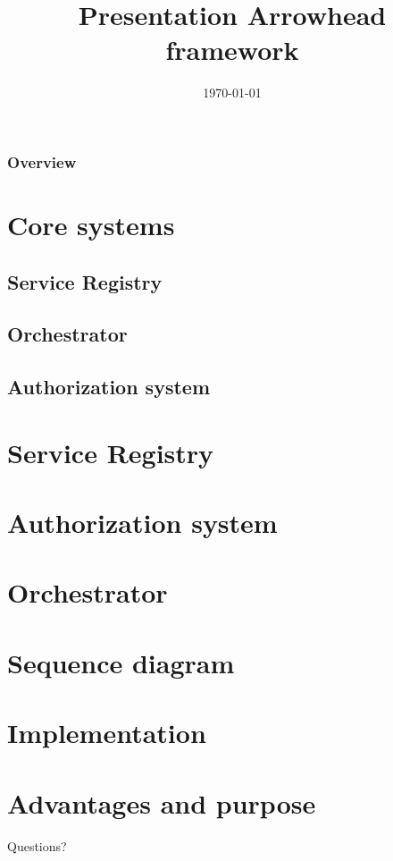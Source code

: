 \documentclass[15pt]{beamer}
\title{Presentation Arrowhead framework}
\author{}
\institute{Luleå University of Technology}
\date{\today}
\begin{document}
\begin{frame}
    \titlepage
\end{frame}

\begin{frame}
    \frametitle{Overview}
    \tableofcontents
\end{frame}

\section{Core systems}
    \subsection{Service Registry}
    \subsection{Orchestrator}
    \subsection{Authorization system}
    
    
\section{Service Registry}
    
    
\section{Authorization system}
    
    
\section{Orchestrator}
    
    
\section{Sequence diagram}
    
    
\section{Implementation}
    
    
\section{Advantages and purpose}
    
    
\begin{frame}
    \begin{center}
        \Huge Questions?
    \end{center}
\end{frame}
\end{document}
